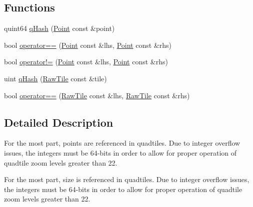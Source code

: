 \subsection*{Functions}
\begin{DoxyCompactItemize}
\item 
quint64 \hyperlink{group___o_p_map_widget_ga684da93d6a34494be39f2a374429e7e7}{q\-Hash} (\hyperlink{structcore_1_1_point}{Point} const \&point)
\item 
bool \hyperlink{group___o_p_map_widget_ga652c57ec321fe6e8b42404776fb48e49}{operator==} (\hyperlink{structcore_1_1_point}{Point} const \&lhs, \hyperlink{structcore_1_1_point}{Point} const \&rhs)
\item 
bool \hyperlink{group___o_p_map_widget_ga9fd3fb077a6e407e4c5a477a8c6d73a0}{operator!=} (\hyperlink{structcore_1_1_point}{Point} const \&lhs, \hyperlink{structcore_1_1_point}{Point} const \&rhs)
\item 
uint \hyperlink{group___o_p_map_widget_ga45a81278b07bda2f00748b2eb7f10e01}{q\-Hash} (\hyperlink{classcore_1_1_raw_tile}{Raw\-Tile} const \&tile)
\item 
bool \hyperlink{group___o_p_map_widget_ga17ed512ed98b14303d6db91fc1624c5e}{operator==} (\hyperlink{classcore_1_1_raw_tile}{Raw\-Tile} const \&lhs, \hyperlink{classcore_1_1_raw_tile}{Raw\-Tile} const \&rhs)
\end{DoxyCompactItemize}


\subsection{Detailed Description}
For the most part, points are referenced in quadtiles. Due to integer overflow issues, the integers must be 64-\/bits in order to allow for proper operation of quadtile zoom levels greater than 22.

For the most part, size is referenced in quadtiles. Due to integer overflow issues, the integers must be 64-\/bits in order to allow for proper operation of quadtile zoom levels greater than 22. 